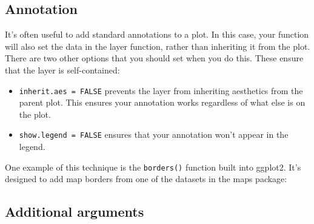 \subsection{Annotation}

It's often useful to add standard annotations to a plot. In this case,
your function will also set the data in the layer function, rather than
inheriting it from the plot. There are two other options that you should
set when you do this. These ensure that the layer is self-contained:

\begin{itemize}
\item
  \texttt{inherit.aes = FALSE} prevents the layer from inheriting
  aesthetics from the parent plot. This ensures your annotation works
  regardless of what else is on the plot. 
\item
  \texttt{show.legend = FALSE} ensures that your annotation won't appear
  in the legend. 
\end{itemize}

One example of this technique is the \texttt{borders()} function built
into ggplot2. It's designed to add map borders from one of the datasets
in the maps package: 

\begin{Shaded}
\begin{Highlighting}[]
\StringTok{ } \NormalTok{, } \NormalTok{, } \NormalTok{, }
                     
  \StringTok{ }
  \NormalTok{(}
     
       
     \NormalTok{, } 
  \NormalTok{)}
\NormalTok{\}}
\end{Highlighting}
\end{Shaded}

\subsection{Additional arguments}

